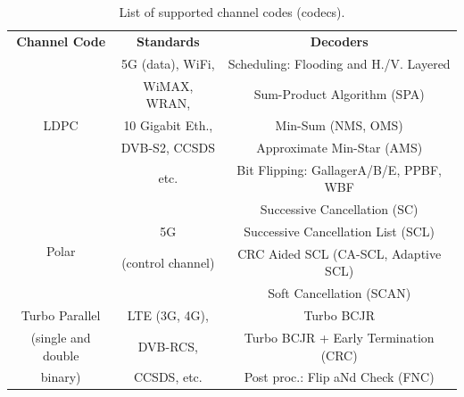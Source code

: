 \begin{table}[htp]
  \centering
  \caption{List of supported channel codes (codecs).}
  \label{tab:lib_codecs}
  \begin{tabular}{ c | c | c }
  \multirow{2}{*}{\textbf{Channel Code}}  & \multirow{2}{*}{\textbf{Standards}} & \multirow{2}{*}{\textbf{Decoders}}     \\
                                          &                                     &                                        \\
  \hline
  \hline
  \multirow{5}{*}{{LDPC}}                 & 5G (data), WiFi,                    & Scheduling: Flooding and H./V. Layered \\
                                          & WiMAX, WRAN,                        & Sum-Product Algorithm (SPA)            \\
                                          & 10 Gigabit Eth.,                    & Min-Sum (NMS, OMS)                     \\
                                          & DVB-S2, CCSDS                       & Approximate Min-Star (AMS)             \\
                                          & etc.                                & Bit Flipping: GallagerA/B/E, PPBF, WBF \\
  \hline
  \multirow{4}{*}{{Polar}}                &                                     & Successive Cancellation (SC)           \\
                                          & 5G                                  & Successive Cancellation List (SCL)     \\
                                          & (control channel)                   & CRC Aided SCL (CA-SCL, Adaptive SCL)   \\
                                          &                                     & Soft Cancellation (SCAN)               \\
  \hline
  \multirow{1}{*}{{Turbo Parallel}}       & LTE (3G, 4G),                       & Turbo BCJR                             \\
  (single and double                      & DVB-RCS,                            & Turbo BCJR + Early Termination (CRC)   \\
  binary)                                 & CCSDS, etc.                         & Post proc.: Flip aNd Check (FNC)       \\
  \hline

\end{tabular}
\end{table}
